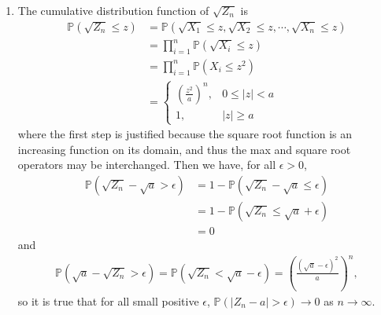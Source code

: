 \documentclass[a4paper,12pt]{article}
\begin{document}
\begin{enumerate}
\begin{enumerate}
            \item
                The cumulative distribution function of $\sqrt{Z_n}$ is
                \begin{align*}
                    \mathbb{P}(\sqrt{Z_n} \leq z) &= \mathbb{P}(\sqrt{X_1} \leq z, \sqrt{X_2} \leq z, \cdots, \sqrt{X_n} \leq z) \\
                    &= \prod_{i = 1}^n \mathbb{P}(\sqrt{X_i} \leq z) \\
                    &= \prod_{i = 1}^n \mathbb{P}(X_i \leq z^2) \\
                    &=  \begin{cases}
                        \left( \frac{z^2}{a} \right)^n, &0 \leq |z| < a \\
                        1, &|z| \geq a
                    \end{cases}
                \end{align*}
                where the first step is justified because the square root function is an increasing function on its domain, and thus the max and square root operators may be interchanged. Then we have, for all $\epsilon > 0$,
                \begin{align*}
                    \mathbb{P}(\sqrt{Z_n} - \sqrt{a} > \epsilon) &= 1 - \mathbb{P}(\sqrt{Z_n} - \sqrt{a} \leq \epsilon) \\
                    &= 1 - \mathbb{P}(\sqrt{Z_n} \leq \sqrt{a} + \epsilon) \\
                    &= 0
                \end{align*}
                and
                \begin{gather*}
                    \mathbb{P}(\sqrt{a} - \sqrt{Z_n} > \epsilon) = \mathbb{P}(\sqrt{Z_n} < \sqrt{a} - \epsilon) = \left( \frac{(\sqrt{a} - \epsilon)^2}{a} \right)^n,
                \end{gather*}
                so it is true that for all small positive $\epsilon$, $\mathbb{P}(|Z_n - a| > \epsilon) \to 0$ as $n \to \infty$.


\end{enumerate}
\end{enumerate}
\end{document}
